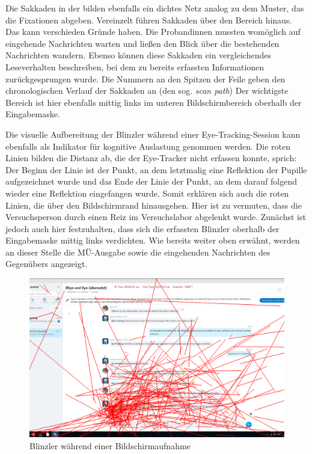 Die Sakkaden in der  bilden ebenfalls ein dichtes Netz analog zu dem Muster, das die Fixationen abgeben. Vereinzelt führen Sakkaden über den Bereich hinaus. Das kann verschieden Gründe haben. Die Proband{\textperiodcentered}innen mussten womöglich auf eingehende Nachrichten warten und ließen den Blick über die bestehenden Nachrichten wandern. Ebenso können diese Sakkaden ein vergleichendes Leseverhalten beschreiben, bei dem zu bereits erfassten Informationen zurückgesprungen wurde. Die Nummern an den Spitzen der Feile geben den chronologischen Verlauf der Sakkaden an (den sog. \emph{scan path}) Der wichtigste Bereich ist hier ebenfalls mittig links im unteren Bildschirmbereich oberhalb der Eingabemaske.\largerpage

Die visuelle Aufbereitung der Blinzler während einer Eye-Tracking-Session kann ebenfalls als Indikator für kognitive Auslastung genommen werden. Die roten Linien bilden die Distanz ab, die der Eye-Tracker nicht erfassen konnte, sprich: Der Beginn der Linie ist der Punkt, an dem letztmalig eine Reflektion der Pupille aufgezeichnet wurde und das Ende der Linie der Punkt, an dem darauf folgend wieder eine Reflektion eingefangen wurde. Somit erklären sich auch die roten Linien, die über den Bildschirmrand hinausgehen. Hier ist zu vermuten, dass die Versuchsperson durch einen Reiz im Versuchslabor abgelenkt wurde. Zunächst ist jedoch auch hier festzuhalten, dass sich die erfassten Blinzler oberhalb der Eingabemaske mittig links verdichten. Wie bereits weiter oben erwähnt, werden an dieser Stelle die MÜ-Ausgabe sowie die eingehenden Nachrichten des Gegenübers angezeigt.


\begin{figure}
    \includegraphics[width=\textwidth]{Figures/Fixmaps/CatDe/Overlay_Image_TN24_Trial_1_Blinks}
	\caption{Blinzler während einer Bildschirmaufnahme\label{K6:fig:blinks-TN24}}
\end{figure}


